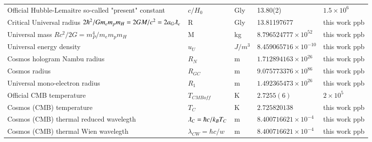 \documentclass[a4paper,9pt]{article}
\begin{document}
\begin{appendix}
\begin{table}
\begin{tabular}{lllll}
   Official Hubble-Lemaitre so-called "present" constant & $c/H_0$ & Gly & 13.80(2)    & $1.5 \times 10^6$ \\  
   Critical Universal radius $2\hbar^2/Gm_em_pm_H=2GM/c^2=2a_G\lambdabar_{e}$ & R &  Gly & 13.81197677  & this work ppb\\   
   Universal mass $Rc^2/2G = m_P^4/m_em_pm_H$ & M & kg & $8.796524777 \times 10^{52}$ & this work ppb \\    
   Universal energy density & $u_U$ & $J/m^3$ & $8.459065716 \times 10^{-10}$ & this work ppb \\   
   Cosmos hologram Nambu radius & $R_N$ &  m & $1.712894163 \times 10^{26}$ & this work ppb\\   
   Cosmos radius & $R_{GC}$ &  m & $9.075773376 \times 10^{86}$ & this work ppb \\   
   Universal mono-electron radius & $R_1$ &  m & $1.492365473 \times 10^{26}$ & this work ppb \\    
   Official CMB temperature & $T_{CMBoff}$ & K & $2.7255(6)$ & $2 \times 10^5$ \\    
   Cosmos (CMB) temperature & $T_{C}$ & K & $2.725820138$ & this work ppb \\
   Cosmos (CMB) thermal reduced wavelegth & $\lambdabar_{C} = \hbar c/ k_B T_C $ & m & $8.400716621 \times 10^{-4} $ & this work ppb \\ 
   
   Cosmos (CMB) thermal Wien wavelegth & $\lambda_{CW} = \hbar c/ w $ & m & $8.400716621 \times 10^{-4} $ & this work ppb \\ 
   

\end{tabular}
\end{table}
\end{appendix}
\end{document}
